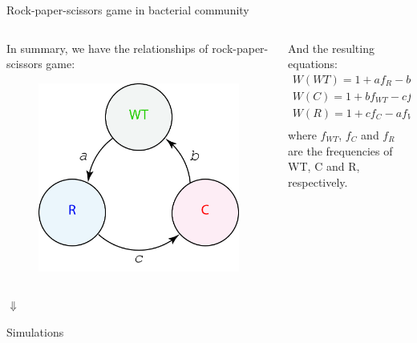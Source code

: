 \begin{frame}{Rock-paper-scissors game in bacterial community}
	\begin{columns}
		\begin{column}{0.5\textwidth}
			\begin{center}
				In summary, we have the relationships of rock-paper-scissors game:
			\end{center}
			\begin{figure}
				\includegraphics[scale=0.12]{img/figure_rock-scissor-paper.jpg}			
			\end{figure}
		\end{column}
		\begin{column}{0.5\textwidth}
			\begin{center}
				And the resulting equations:
			\begin{align*}
				W\left(WT\right) = 1 + af_R - bf_C\\
				W\left(C\right) = 1 + bf_{WT} - cf_R\\
				W\left(R\right) = 1 + cf_C - af_{WT}\\
			\end{align*}
			where $f_{WT}$, $f_C$ and $f_R$ are the frequencies of WT, C and R, respectively. 
			\end{center}
		\end{column}
	\end{columns}
	\pause
	\begin{center}
		{\LARGE $\Downarrow$\\}
		\begin{block}
			{\centering
				Simulations
			}
		\end{block}
	\end{center}	
\end{frame}


